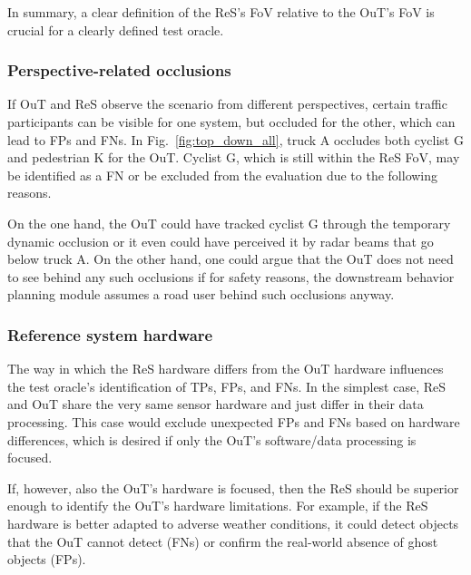 \documentclass[conference]{IEEEtran}
\begin{document}
In summary, a clear definition of the ReS's FoV relative to the OuT's FoV is crucial for a clearly defined test oracle. 

\subsubsection{Perspective-related occlusions}
\label{sec:occlusions}

If OuT and ReS observe the scenario from different perspectives, certain traffic participants can be visible for one system, but occluded for the other, which can lead to FPs and FNs. 
In Fig.~\ref{fig:top_down_all}, truck A occludes both cyclist G and pedestrian K for the OuT. 
Cyclist G, which is still within the ReS FoV, may be identified as a FN or be excluded from the evaluation due to the following reasons. 

On the one hand, the OuT could have tracked cyclist G through the temporary dynamic occlusion or it even could have perceived it by radar beams that go below truck A. 
On the other hand, one could argue that the OuT does not need to see behind any such occlusions if for safety reasons, the downstream behavior planning module assumes a road user behind such occlusions anyway.




\subsubsection{Reference system hardware}
\label{sec:ref_hw}

The way in which the ReS hardware differs from the OuT hardware influences the test oracle's identification of TPs, FPs, and FNs. 
In the simplest case, ReS and OuT share the very same sensor hardware and just differ in their data processing. 
This case would exclude unexpected FPs and FNs based on hardware differences, which is desired if only the OuT's software/data processing is focused. 

If, however, also the OuT's hardware is focused, then the ReS should be superior enough to identify the OuT's hardware limitations. 
For example, if the ReS hardware is better adapted to adverse weather conditions, it could detect objects that the OuT cannot detect (FNs) or confirm the real-world absence of ghost objects (FPs). 
\end{document}
